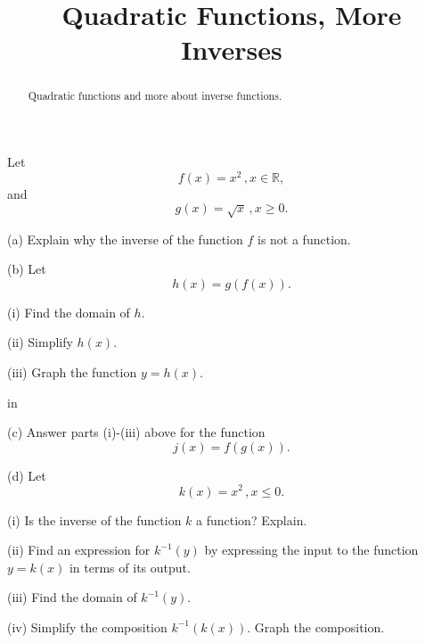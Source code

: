 \documentclass{ximera}
\title{Quadratic Functions, More Inverses}
\newcommand{\pskip}{\vskip 0.1 in}
\begin{document}
\begin{abstract}
Quadratic functions and more about inverse functions.
\end{abstract}
\maketitle

\begin{question}    \label{Q1:Quadratics}
Let 
\[
    f(x) = x^2 \, , x \in \mathbb{R} ,
\]
and 
\[
     g(x) = \sqrt{x} \, , x\geq 0 .
\]

(a) Explain why the inverse of the function $f$ is not a function.

(b) Let 
\[
    h(x) = g(f(x)) .
\]

(i) Find the domain of $h$.

(ii) Simplify $h(x)$.

(iii) Graph the function $y=h(x)$.

\pskip

(c) Answer parts (i)-(iii) above for the function
\[
   j(x) = f(g(x)) .
\]

(d) Let
\[
   k(x) = x^2 \, , x\leq 0 .
\]

(i) Is the inverse of the function $k$ a function? Explain.

(ii) Find an expression for $k^{-1}(y)$ by expressing the input to the function $y=k(x)$ in terms of its output.

(iii) Find the domain of $k^{-1}(y)$.

(iv) Simplify the composition $k^{-1}(k(x))$. Graph the composition.

\end{question}
\end{document}
